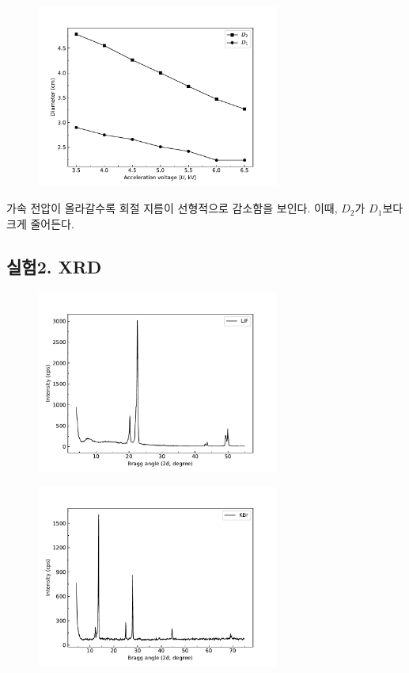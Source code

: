 \documentclass[a4paper, 10pt, nanum]{CSUniSchoolLabReport}
\begin{document}
	\begin{figure}[ht!]
		\centering
		\includegraphics[width=8cm]{Figures/graph1.pdf}
		\caption{}
		\label{fig:graph1}
	\end{figure}

	가속 전압이 올라갈수록 회절 지름이 선형적으로 감소함을 보인다. 이때, $D_2$가 $D_1$보다 크게 줄어든다.


\subsection*{실험2. XRD}
	
	\begin{figure}[ht!]
		\centering
		\includegraphics[width=8cm]{Figures/graph2-1.pdf}
		\caption{}
		\label{fig:graph2-1}
	\end{figure}

	\begin{figure}[ht!]
		\centering
		\includegraphics[width=8cm]{Figures/graph2-2.pdf}
		\caption{}
		\label{fig:graph2-2}
	\end{figure}
\end{document}
